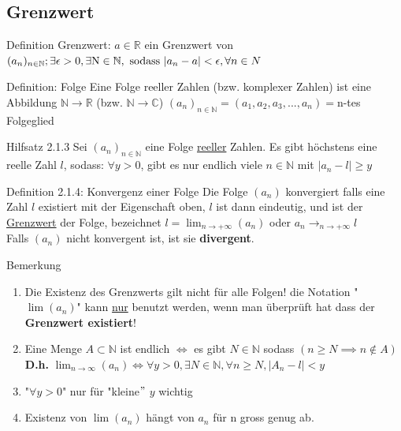 \documentclass[a4paper,10pt]{article}
\def\R{\mathbb{R}}
\begin{document}
\subsection{Grenzwert}
\begin {defbox}{Definition Grenzwert: } $a \in \R $ ein Grenzwert von $(a_n)_{n\in \mathbb{N}};\\ \exists \epsilon > 0, \exists \text{N} \in \mathbb{N}, \text{ sodass } |a_n-a|<\epsilon, \forall n \in N $ 
\end {defbox}
\begin{defbox}{Definition: Folge} Eine Folge reeller Zahlen (bzw. komplexer Zahlen) ist eine Abbildung $\mathbb{N} \longrightarrow \mathbb{R} $ (bzw. $\mathbb{N}\longrightarrow\mathbb{C}$)
$(a_n)_{n\in \mathbb{N}}=(a_1,a_2,a_3,...,a_n)=$n-tes Folgeglied
\end{defbox}
\begin{tbox}{Hilfsatz 2.1.3}
Sei $(a_n)_{n\in\mathbb{N}}$ eine Folge \underline{reeller} Zahlen. Es gibt höchstens eine reelle Zahl $l$, sodass: $\forall y>0$, gibt es nur endlich viele $n\in \mathbb{N}$ mit $|a_n-l|\ge y$
\end{tbox}

\begin{defbox}{Definition 2.1.4: Konvergenz einer Folge}
Die Folge $(a_n)$ konvergiert falls eine Zahl $l$ existiert mit der Eigenschaft oben, $l$ ist dann eindeutig, und ist der \underline{Grenzwert} der Folge, bezeichnet 
$l=\lim_{n\to +\infty}(a_n)$ oder $a_n\longrightarrow_{n\to +\infty} l$\\
Falls $(a_n)$ nicht konvergent ist, ist sie \textbf{divergent}.
\end{defbox}

\begin{bembox}{Bemerkung}
\begin{enumerate}
    \item Die Existenz des Grenzwerts gilt nicht für alle Folgen! die Notation "$\lim(a_n)$" kann \underline{nur} benutzt werden, wenn man überprüft hat dass der \textbf{Grenzwert existiert}!
    \item Eine Menge $ A  \subset \mathbb{N}$ ist endlich $\iff$ es gibt $N\in \mathbb{N}$ sodass $ (n\ge N \implies n\notin A) $\\
    \textbf{D.h.} $\lim_{n\to\infty}(a_n)\iff\forall y >0, \exists N \in \mathbb{N}, \forall n \ge N, |A_n-l|< y$ 
    \item "$\forall y > 0 $" nur für "kleine$"$ $y$ wichtig
    \item Existenz von $\lim(a_n)$ hängt von $a_n$ für n gross genug ab.
\end{enumerate}
\end{bembox}
\end{document}
